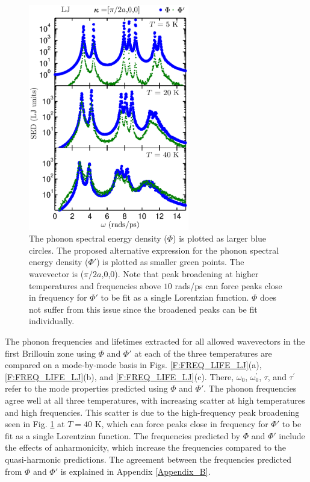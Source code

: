 \documentclass[aps,prb,preprint,superscriptaddress,amsmath,amssymb,floatfix]{revtex4}
\begin{document}
\begin{figure}
\begin{center}
\includegraphics[angle=0,width=70.0mm]{LJ_NMD_SED_PEAK_COMPARE.eps}
\vspace*{-5mm}
\end{center}
\caption{\label{F:PEAK_COMPARE} The phonon spectral energy density ($\Phi$) is plotted as larger blue circles.  The proposed alternative expression for the phonon spectral energy density ($\Phi'$) is plotted as smaller green points. The wavevector is ($\pi/2a$,0,0). Note that peak broadening at higher temperatures and frequencies above $10$ rads/ps can force peaks close in frequency for $\Phi'$ to be fit as a single Lorentzian function. $\Phi$ does not suffer from this issue since the broadened peaks can be fit individually.}
\end{figure}

The phonon frequencies and lifetimes extracted for all allowed wavevectors in the first Brillouin zone using $\Phi$ and $\Phi'$ at each of the three temperatures are compared on a mode-by-mode basis in Figs$.$ \ref{F:FREQ_LIFE_LJ}(a), \ref{F:FREQ_LIFE_LJ}(b), and \ref{F:FREQ_LIFE_LJ}(c). There, $\omega_0$, $\omega_0^{'}$, $\tau$, and $\tau^{'}$  refer to the mode properties predicted using $\Phi$ and $\Phi'$. The phonon frequencies agree well at all three temperatures, with increasing scatter at high temperatures and high frequencies.  This scatter is due to the high-frequency peak broadening seen in Fig$.$ \ref{F:PEAK_COMPARE} at $T = 40$ K, which can force peaks close in frequency for $\Phi'$ to be fit as a single Lorentzian function. The frequencies predicted by $\Phi$ and $\Phi'$ include the effects of anharmonicity, which increase the frequencies compared to the quasi-harmonic predictions.\cite{mcgaughey2004c,turney2009a} The agreement between the frequencies predicted from $\Phi$ and $\Phi'$ is explained in Appendix \ref{Appendix_B}.
\end{document}
